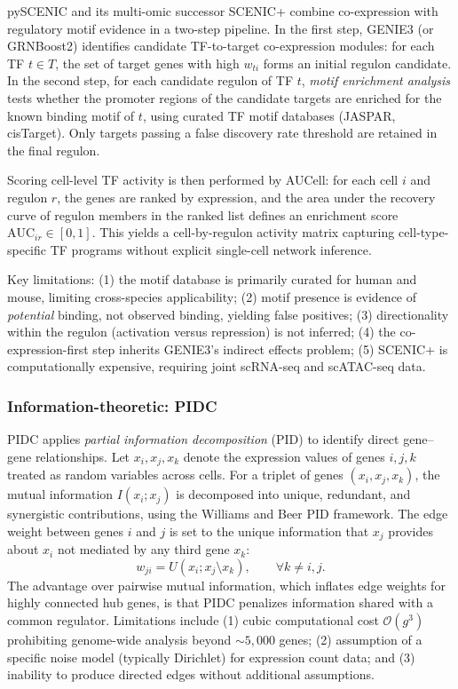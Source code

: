 pySCENIC \cite{aibarSCENICSinglecellRegulatory2017} and its multi-omic successor SCENIC+
\cite{bravogonzalez-blasSCENICSinglecellMultiomic2023} combine co-expression with regulatory motif
evidence in a two-step pipeline. In the first step, GENIE3 (or GRNBoost2) identifies candidate
\gls{TF}-to-target co-expression modules: for each \gls{TF} \(t \in T\), the set of target genes
with high \(w_{ti}\) forms an initial regulon candidate. In the second step, for each candidate
regulon of \gls{TF} \(t\), \emph{motif enrichment analysis} tests whether the promoter regions
of the candidate targets are enriched for the known binding motif of \(t\), using curated
\gls{TF} motif databases (JASPAR, cisTarget). Only targets passing a false discovery rate
threshold are retained in the final regulon.

Scoring cell-level \gls{TF} activity is then performed by AUCell: for each cell \(i\) and regulon
\(r\), the genes are ranked by expression, and the area under the recovery curve of regulon members
in the ranked list defines an enrichment score \(\text{AUC}_{ir} \in [0,1]\). This yields a
cell-by-regulon activity matrix capturing cell-type-specific \gls{TF} programs without explicit
single-cell network inference.

Key limitations: (1) the motif database is primarily curated for human and mouse, limiting
cross-species applicability; (2) motif presence is evidence of \emph{potential} binding, not
observed binding, yielding false positives; (3) directionality within the regulon (activation
versus repression) is not inferred; (4) the co-expression-first step inherits GENIE3's indirect
effects problem; (5) SCENIC+ is computationally expensive, requiring joint scRNA-seq and
\gls{scATAC-seq} data.

\subsubsection{Information-theoretic: PIDC}
PIDC \cite{pratapaBenchmarkingAlgorithmsGene2020} applies \emph{partial information decomposition}
(PID) to identify direct gene--gene relationships. Let \(x_i, x_j, x_k\) denote the expression
values of genes \(i, j, k\) treated as random variables across cells. For a triplet of genes
\((x_i, x_j, x_k)\), the mutual information \(I(x_i; x_j)\) is decomposed into unique, redundant,
and synergistic contributions, using the Williams and Beer PID framework. The edge weight between genes \(i\) and
\(j\) is set to the unique information that \(x_j\) provides about \(x_i\) not mediated by any
third gene \(x_k\):
\begin{equation}
  w_{ji} = U(x_i; x_j \setminus x_k), \qquad \forall k \neq i,j.
\end{equation}
The advantage over pairwise mutual information, which inflates edge weights for highly connected
hub genes, is that PIDC penalizes information shared with a common regulator. Limitations include
(1) cubic computational cost \(\mathcal{O}(g^3)\) prohibiting genome-wide analysis beyond
\(\sim\!5{,}000\) genes; (2) assumption of a specific noise model (typically Dirichlet) for
expression count data; and (3) inability to produce directed edges without additional assumptions.

